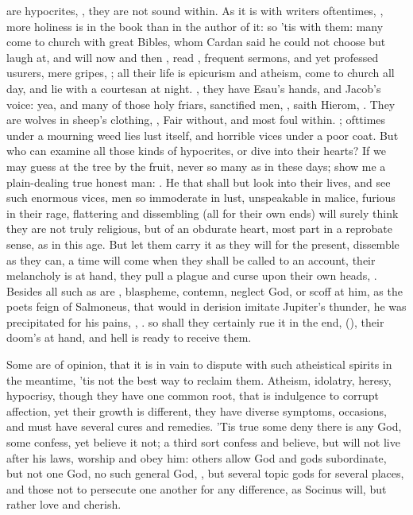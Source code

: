 {are hypocrites, , they
are not sound within. As it is with writers oftentimes, , more holiness is in the
book than in the author of it: so 'tis with them: many come to church
with great Bibles, whom Cardan said he could not choose but laugh at,
and will now and then , read \Austin{}, frequent
sermons, and yet professed usurers, mere gripes, ; all their life is epicurism and atheism, come to church
all day, and lie with a courtesan at night. , they have Esau's hands, and Jacob's voice: yea, and
many of those holy friars, sanctified men, , saith Hierom, . They are wolves in sheep's
clothing, , Fair without, and
most foul within. ; ofttimes under a mourning weed lies
lust itself, and horrible vices under a poor coat. But who can examine
all those kinds of hypocrites, or dive into their hearts? If we may
guess at the tree by the fruit, never so many as in these days; show me
a plain-dealing true honest man: . He that shall but look into their lives, and see such enormous
vices, men so immoderate in lust, unspeakable in malice, furious in
their rage, flattering and dissembling (all for their own ends) will
surely think they are not truly religious, but of an obdurate heart,
most part in a reprobate sense, as in this age. But let them carry it
as they will for the present, dissemble as they can, a time will come
when they shall be called to an account, their melancholy is at hand,
they pull a plague and curse upon their own heads, . Besides all such as are , blaspheme, contemn,
neglect God, or scoff at him, as the poets feign of Salmoneus, that
would in derision imitate Jupiter's thunder, he was precipitated for
his pains, , \etc{}. so shall they certainly rue it
in the end, (), their doom's at
hand, and hell is ready to receive them.

Some are of opinion, that it is in vain to dispute with such
atheistical spirits in the meantime, 'tis not the best way to reclaim
them. Atheism, idolatry, heresy, hypocrisy, though they have one common
root, that is indulgence to corrupt affection, yet their growth is
different, they have diverse symptoms, occasions, and must have several
cures and remedies. 'Tis true some deny there is any God, some confess,
yet believe it not; a third sort confess and believe, but will not live
after his laws, worship and obey him: others allow God and gods
subordinate, but not one God, no such general God, , but
several topic gods for several places, and those not to persecute one
another for any difference, as Socinus will, but rather love and
cherish.

}
